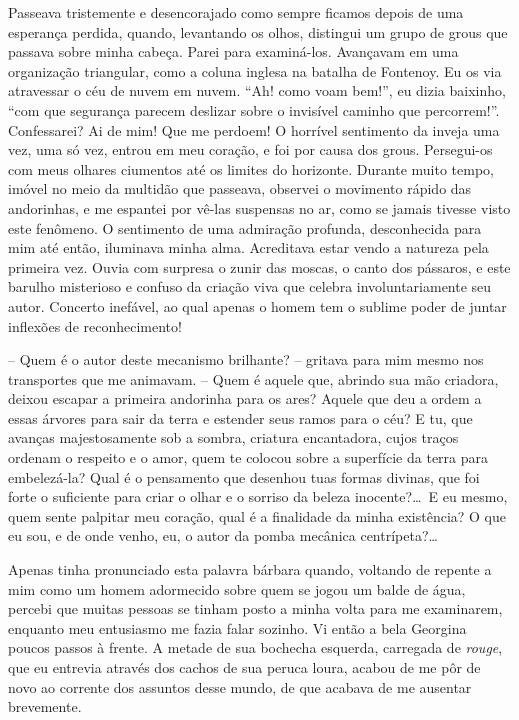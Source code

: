  Passeava tristemente e desencorajado como sempre ficamos depois de uma
esperança perdida, quando, levantando os olhos, distingui um grupo de
grous que passava sobre minha cabeça. Parei para examiná-los. Avançavam
em uma organização triangular, como a coluna inglesa na batalha de
Fontenoy. Eu os via atravessar o céu de nuvem em nuvem. ``Ah! como voam
bem!'', eu dizia baixinho, ``com que segurança parecem deslizar sobre o
invisível caminho que percorrem!''. Confessarei? Ai de mim! Que me
perdoem! O horrível sentimento da inveja uma vez, uma só vez, entrou em
meu coração, e foi por causa dos grous. Persegui-os com meus olhares
ciumentos até os limites do horizonte. Durante muito tempo, imóvel no
meio da multidão que passeava, observei o movimento rápido das
andorinhas, e me espantei por vê-las suspensas no ar, como se jamais
tivesse visto este fenômeno. O sentimento de uma admiração profunda,
desconhecida para mim até então, iluminava minha alma. Acreditava estar
vendo a natureza pela primeira vez. Ouvia com surpresa o zunir das
moscas, o canto dos pássaros, e este barulho misterioso e confuso da
criação viva que celebra involuntariamente seu autor. Concerto
inefável, ao qual apenas o homem tem o sublime poder de juntar
inflexões de reconhecimento! 

-- Quem é o autor deste mecanismo brilhante? -- gritava para mim mesmo
nos transportes que me animavam. -- Quem é aquele que, abrindo sua mão
criadora, deixou escapar a primeira andorinha para os ares? Aquele que
deu a ordem a essas árvores para sair da terra e estender seus ramos
para o céu? E tu, que avanças majestosamente sob a sombra, criatura
encantadora, cujos traços ordenam o respeito e o amor, quem te colocou
sobre a superfície da terra para embelezá-la? Qual é o pensamento que
desenhou tuas formas divinas, que foi forte o suficiente para criar o
olhar e o sorriso da beleza inocente?\ldots\ E eu mesmo, quem sente
palpitar meu coração, qual é a finalidade da minha existência? O que eu
sou, e de onde venho, eu, o autor da pomba mecânica centrípeta?\ldots

 Apenas tinha pronunciado esta palavra bárbara quando, voltando de
repente a mim como um homem adormecido sobre quem se jogou um balde de
água, percebi que muitas pessoas se tinham posto a minha volta para me
examinarem, enquanto meu entusiasmo me fazia falar sozinho. Vi então a
bela Georgina poucos passos à frente. A metade de sua bochecha
esquerda, carregada de \textit{rouge}, que eu entrevia através dos
cachos de sua peruca loura, acabou de me pôr de novo ao corrente dos
assuntos desse mundo, de que acabava de me ausentar brevemente.

